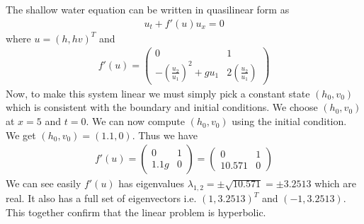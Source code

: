 The shallow water equation can be written in quasilinear form as \begin{align*}
u_t + f'(u) u_x = 0
\end{align*}
where $ u = (h,hv)^T $ and 
\begin{align*}
f'(u) = \begin{pmatrix}
0 & 1 \\
-(\frac{u_2}{u_1})^2 + gu_1 & 2 (\frac{u_2}{u_1})
\end{pmatrix}
\end{align*}
Now, to make this system linear we must simply pick a constant state $(h_0,v_0)$ which is consistent with the boundary and initial conditions. We choose $(h_0,v_0)$ at $x=5$ and $t=0$. We can now compute $(h_0,v_0)$ using the initial condition. We get $(h_0,v_0) = (1.1,0)$. Thus we have 
\begin{align*}
f'(u) = \begin{pmatrix}
0 & 1 \\
1.1g & 0
\end{pmatrix} = \begin{pmatrix}
0 & 1 \\
10.571 & 0
\end{pmatrix}
\end{align*}
We can see easily $f'(u)$ has eigenvalues $\lambda_{1,2} = \pm \sqrt{10.571} = \pm 3.2513$ which are real. It also has a full set of eigenvectors i.e. $(1,3.2513)^T$ and $(-1,3.2513)$. This together confirm that the linear problem is hyperbolic. 